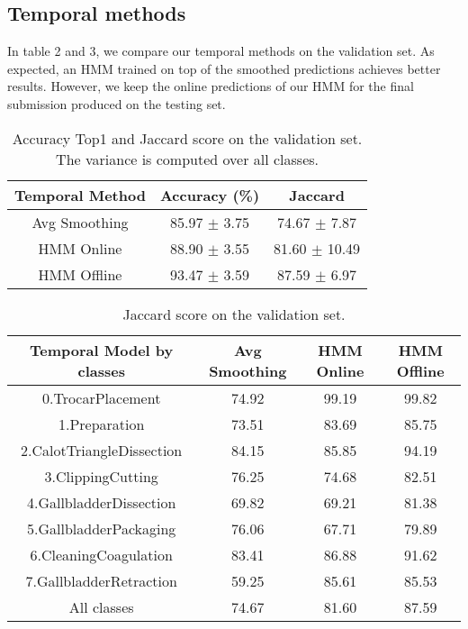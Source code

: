 \documentclass[10pt,twocolumn,letterpaper]{article}
\begin{document}
\subsection{Temporal methods}

In table 2 and 3, we compare our temporal methods on the validation set. As expected, an HMM trained on top of the smoothed predictions achieves better results. However, we keep the online predictions of our HMM for the final submission produced on the testing set.

\begin{table}
	\begin{center}
		\begin{tabular}{|c|c|c|}
			\hline
			Temporal Method & Accuracy (\%) & Jaccard \\
			\hline\hline
			Avg Smoothing & 85.97 $\pm$ 3.75 & 74.67 $\pm$ 7.87\\
			HMM Online & 88.90 $\pm$ 3.55 & 81.60 $\pm$ 10.49\\
			HMM Offline & 93.47 $\pm$ 3.59 & 87.59 $\pm$ 6.97\\
			\hline
		\end{tabular}
	\end{center}
	\caption{Accuracy Top1 and Jaccard score on the validation set. The variance is computed over all classes.}
\end{table}


\begin{table*}
	\begin{center}
		\begin{tabular}{|c|c|c|c|}
			\hline
			Temporal Model by classes & Avg Smoothing & HMM Online & HMM Offline \\
			\hline \hline
			0.TrocarPlacement & 74.92 & 99.19 & 99.82 \\
			1.Preparation & 73.51 & 83.69 & 85.75 \\
			2.CalotTriangleDissection & 84.15 & 85.85 &  94.19 \\
			3.ClippingCutting & 76.25 & 74.68 & 82.51 \\
			4.GallbladderDissection & 69.82 & 69.21 & 81.38 \\
			5.GallbladderPackaging & 76.06 & 67.71 & 79.89 \\
			6.CleaningCoagulation & 83.41 & 86.88 & 91.62 \\
			7.GallbladderRetraction & 59.25 & 85.61 & 85.53 \\
			\hline
			All classes & 74.67 & 81.60 & 87.59 \\
			\hline
		\end{tabular}
	\end{center}
	\caption{Jaccard score on the validation set.}
\end{table*}
\end{document}

